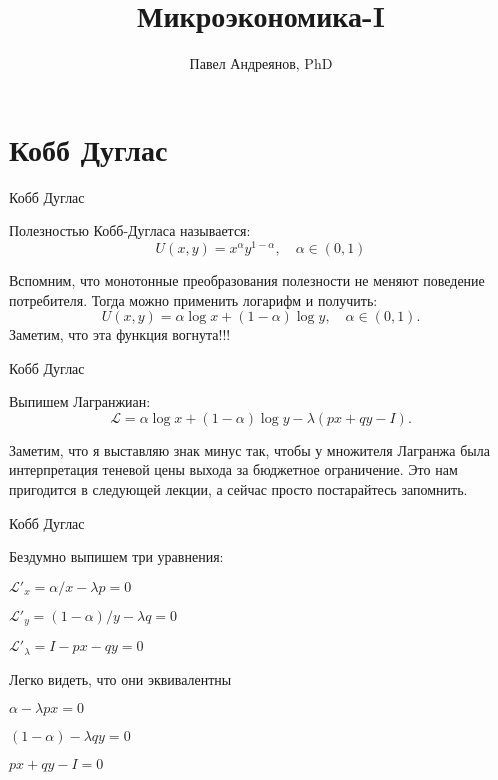 \documentclass{beamer}
\title{
Микроэкономика-I
}
\author{
Павел Андреянов, PhD
}
\begin{document}
\maketitle

\section{Кобб Дуглас}

\begin{frame}{Кобб Дуглас}

\begin{definition}
Полезностью Кобб-Дугласа называется:
$$U(x, y) = x^{\alpha} y^{1-\alpha}, \quad \alpha \in (0,1)$$  
\end{definition}

Вспомним, что монотонные преобразования полезности не меняют поведение потребителя. Тогда можно применить логарифм и получить:
$$ U(x, y) = \alpha \log x + (1-\alpha) \log y, \quad \alpha \in (0,1).$$ 
Заметим, что эта функция вогнута!!! 
\end{frame}

\begin{frame}{Кобб Дуглас}

Выпишем Лагранжиан:
$$ \mathcal{L} = \alpha \log x + (1-\alpha) \log y - \lambda (px + qy -I).$$ 

Заметим, что я выставляю знак минус так, чтобы у множителя Лагранжа была интерпретация теневой цены выхода за бюджетное ограничение. Это нам пригодится в следующей лекции, а сейчас просто постарайтесь запомнить.
\end{frame}

\begin{frame}{Кобб Дуглас}

Бездумно выпишем три уравнения:

$\mathcal{L}'_x = \alpha/ x - \lambda p = 0$

$\mathcal{L}'_y = (1-\alpha)/y - \lambda q = 0$

$\mathcal{L}'_{\lambda} = I - p x - qy = 0$

Легко видеть, что они эквивалентны

$\alpha - \lambda p x= 0$

$(1-\alpha) - \lambda q y= 0$

$px + qy - I = 0$

\end{frame}
\end{document}

